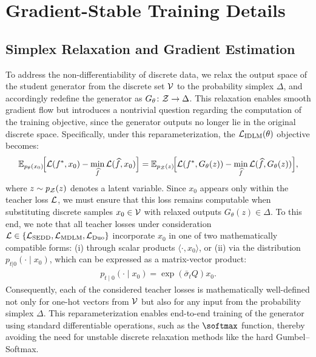 \section{Gradient-Stable Training Details}
\label{app:method_details}

\subsection{Simplex Relaxation and Gradient Estimation}
To address the non-differentiability of discrete data, we relax the output space of the student generator from the discrete set $\mathcal{V}$ to the probability simplex $\Delta$, and accordingly redefine the generator as $G_{\theta}\colon \mathcal{Z} \to \Delta$. This relaxation enables smooth gradient flow but introduces a nontrivial question regarding the computation of the training objective, since the generator outputs no longer lie in the original discrete space. Specifically, under this reparameterization, the $\mathcal{L}_{\text{IDLM}}(\theta)$ objective becomes:
\begin{gather}
  \mathbb{E}_{p_{\theta}(x_0)}\!\Bigl[\mathcal{L}(f^*, x_0) - \min_{\widehat{f}}\mathcal{L}(\widehat{f}, x_0)\Bigr]
  = \mathbb{E}_{p_{\mathcal{Z}}(z)}\!\Bigl[\mathcal{L}(f^*, G_{\theta}(z)) - \min_{\widehat{f}}\mathcal{L}(\widehat{f}, G_{\theta}(z))\Bigr],
  \nonumber
\end{gather}
where $z \sim p_{\mathcal{Z}}(z)$ denotes a latent variable. Since $x_0$ appears only within the teacher loss $\mathcal{L}$, we must ensure that this loss remains computable when substituting discrete samples $x_0 \in \mathcal{V}$ with relaxed outputs $G_{\theta}(z) \in \Delta$. To this end, we note that all teacher losses under consideration $\mathcal{L} \in \{\mathcal{L}_{\text{SEDD}}, \mathcal{L}_{\text{MDLM}}, \mathcal{L}_{\text{Duo}}\}$ incorporate $x_0$ in one of two mathematically compatible forms: (i) through scalar products $\langle \cdot, x_0 \rangle$, or (ii) via the distribution $p_{t|0}(\cdot \mid x_0)$, which can be expressed as a matrix-vector product:
\begin{gather}
    p_{t \mid 0}(\cdot \mid x_0) = \exp\left(\bar{\sigma}_t Q\right)x_0.
    \nonumber
\end{gather}
%
Consequently, each of the considered teacher losses is mathematically well-defined not only for one-hot vectors from $\mathcal{V}$ but also for any input from the probability simplex $\Delta$. This reparameterization enables end-to-end training of the generator using standard differentiable operations, such as the $\softmax$ function, thereby avoiding the need for unstable discrete relaxation methods like the hard Gumbel--Softmax.

